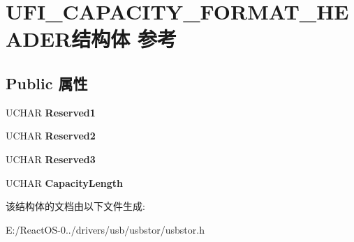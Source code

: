 \hypertarget{struct_u_f_i___c_a_p_a_c_i_t_y___f_o_r_m_a_t___h_e_a_d_e_r}{}\section{U\+F\+I\+\_\+\+C\+A\+P\+A\+C\+I\+T\+Y\+\_\+\+F\+O\+R\+M\+A\+T\+\_\+\+H\+E\+A\+D\+E\+R结构体 参考}
\label{struct_u_f_i___c_a_p_a_c_i_t_y___f_o_r_m_a_t___h_e_a_d_e_r}
\subsection*{Public 属性}
\begin{DoxyCompactItemize}
\item 
\mbox{\label{struct_u_f_i___c_a_p_a_c_i_t_y___f_o_r_m_a_t___h_e_a_d_e_r_a1f5b8eb4d6cb75d8c9c1dafd3d6e34df}} 
U\+C\+H\+AR {\bfseries Reserved1}
\item 
\mbox{\label{struct_u_f_i___c_a_p_a_c_i_t_y___f_o_r_m_a_t___h_e_a_d_e_r_a5617c91b247b4dbecb590b73e7115aa7}} 
U\+C\+H\+AR {\bfseries Reserved2}
\item 
\mbox{\label{struct_u_f_i___c_a_p_a_c_i_t_y___f_o_r_m_a_t___h_e_a_d_e_r_a3e3c8f365e819c2d90e6a046774f9e87}} 
U\+C\+H\+AR {\bfseries Reserved3}
\item 
\mbox{\label{struct_u_f_i___c_a_p_a_c_i_t_y___f_o_r_m_a_t___h_e_a_d_e_r_a52c9b39b58ac0cbffed39465bc33ca33}} 
U\+C\+H\+AR {\bfseries Capacity\+Length}
\end{DoxyCompactItemize}


该结构体的文档由以下文件生成\+:\begin{DoxyCompactItemize}
\item 
E\+:/\+React\+O\+S-\/0../drivers/usb/usbstor/usbstor.\+h\end{DoxyCompactItemize}
